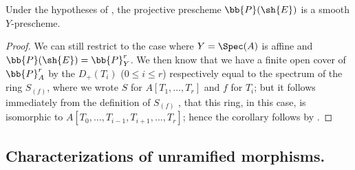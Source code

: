 \begin{corollary}[17.3.9]
\label{IV.17.3.9}
Under the hypotheses of , the projective prescheme $\bb{P}(\sh{E})$  is a smooth $Y$-prescheme.
\end{corollary}

\begin{proof}
We can still restrict to the case where $Y=\Spec(A)$ is affine and $\bb{P}(\sh{E})=\bb{P}_Y^r$.
We then know  that we have a finite open cover of $\bb{P}^r_{A}$ by the $D_+(T_i)$ ($0\leq i\leq r$) respectively equal to the spectrum of the ring $S_{(f)}$, where we wrote $S$ for $A[T_1,\dots,T_r]$ and $f$ for $T_i$;
but it follows immediately from the definition of $S_{(f)}$ , that this ring, in this case, is isomorphic to $A[T_0,\dots,T_{i-1},T_{i+1},\dots,T_r]$;
hence the corollary follows by .
\end{proof}

\subsection{Characterizations of unramified morphisms.}
\label{subsection:IV.17.4} 



